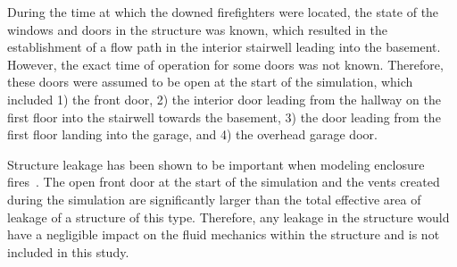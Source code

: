 \documentclass[12pt,oneside]{book}
\begin{document}
During the time at which the downed firefighters were located, the state of the windows and doors in the structure was known, which resulted in the establishment of a flow path in the interior stairwell leading into the basement. However, the exact time of operation for some doors was not known. Therefore, these doors were assumed to be open at the start of the simulation, which included 1) the front door, 2) the interior door leading from the hallway on the first floor into the stairwell towards the basement, 3) the door leading from the first floor landing into the garage, and 4) the overhead garage door.

Structure leakage has been shown to be important when modeling enclosure fires~\cite{beal2009}. The open front door at the start of the simulation and the vents created during the simulation are significantly larger than the total effective area of leakage of a structure of this type. Therefore, any leakage in the structure would have a negligible impact on the fluid mechanics within the structure and is not included in this study.
\end{document}
